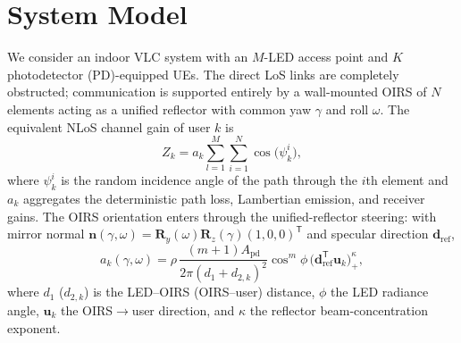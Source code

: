 \documentclass[conference]{IEEEtran}
\begin{document}
\section{System Model}
We consider an indoor VLC system with an $M$-LED access point and $K$
photodetector (PD)-equipped UEs. The direct LoS links are completely
obstructed; communication is supported entirely by a wall-mounted OIRS of $N$
elements acting as a unified reflector with common yaw $\gamma$ and roll
$\omega$. The equivalent NLoS channel gain of user $k$ is
\begin{equation}
Z_k = a_k \sum_{l=1}^{M}\sum_{i=1}^{N} \cos\bigl(\psi_k^{i}\bigr),
\label{eq:Zk}
\end{equation}
where $\psi_k^{i}$ is the random incidence angle of the path through the
$i$th element and $a_k$ aggregates the deterministic path loss, Lambertian
emission, and receiver gains. The OIRS orientation enters through the
unified-reflector steering: with mirror normal
$\mathbf n(\gamma,\omega)=\mathbf R_y(\omega)\mathbf R_z(\gamma)(1,0,0)^{\mathsf T}$
and specular direction $\mathbf d_{\mathrm{ref}}$,
\begin{equation}
a_k(\gamma,\omega)=\rho\,\frac{(m+1)A_{\mathrm{pd}}}{2\pi (d_1+d_{2,k})^2}
\cos^m\!\phi\,
\bigl(\mathbf d_{\mathrm{ref}}^{\mathsf T}\mathbf u_k\bigr)_{+}^{\kappa},
\label{eq:ak}
\end{equation}
where $d_1$ ($d_{2,k}$) is the LED--OIRS (OIRS--user) distance, $\phi$ the
LED radiance angle, $\mathbf u_k$ the OIRS$\to$user direction, and $\kappa$
the reflector beam-concentration exponent.
\end{document}
